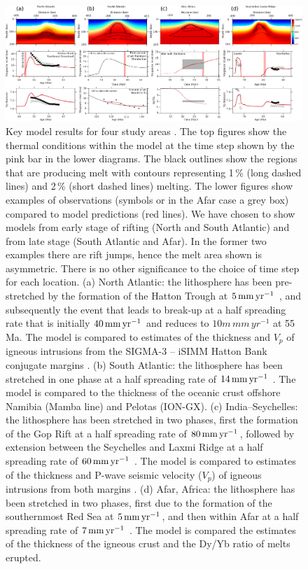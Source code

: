 \begin{figure}
\centering
\includegraphics[width=22.5cm]{./figures/ch2-mantle2.pdf}
\caption{Key model results for four study areas \citep[see][]{armitage-collier-2017}. The top figures show the thermal conditions within the model at the time step shown by the pink bar in the lower diagrams. The black outlines show the regions that are producing melt with contours representing 1\,\% (long dashed lines) and 2\,\% (short dashed lines) melting. The lower figures show examples of observations (symbols or in the Afar case a grey box) compared to model predictions (red lines). We have chosen to show models from early stage of rifting (North and South Atlantic) and from late stage (South Atlantic and Afar). In the former two examples there are rift jumps, hence the melt area shown is asymmetric. There is no other significance to the choice of time step for each location. (a) North Atlantic: the lithosphere has been pre-stretched by the formation of the Hatton Trough at $5\rm\,mm\,yr^{-1}$ \citep[see][]{armitage-etal-2009}, and subsequently the event that leads to break-up at a half spreading rate that is initially $40\rm\,mm\,yr^{-1}$ and reduces to $10
m\,mm\,yr^{-1}$ at 55\,Ma. The model is compared to estimates of the thickness and $V_{p}$ of igneous intrusions from the SIGMA-3 -- iSIMM Hatton Bank conjugate margins \citep{hopper-etal-2003,white-etal-2008}. (b) South Atlantic: the lithosphere has been stretched in one phase at a half spreading rate of $14\rm\,mm\,yr^{-1}$ \citep[see][]{taposeea-etal-2016}. The model is compared to the thickness of the oceanic crust offshore Namibia (Mamba line) and Pelotas (ION-GX). (c) India–Seychelles: the lithosphere has been stretched in two phases, first the formation of the Gop Rift at a half spreading rate of $80\rm\,mm\,yr^{-1}$, followed by extension between the Seychelles and Laxmi Ridge at a half spreading rate of $60\rm\,mm\,yr^{-1}$ \citep[see][]{armitage-etal-g3-2011}. The model is compared to estimates of the thickness and P-wave seismic velocity ($V_{p}$) of igneous intrusions from both margins \citep{collier-etal-2009,minshull-etal-2008}. (d) Afar, Africa: the lithosphere has been stretched in two phases, first due to the formation of the southernmost Red Sea at $5\rm\,mm\,yr^{-1}$, and then within Afar at a half spreading rate of $7\rm\,mm\,yr^{-1}$ \citep[see][]{armitage-etal-2015}. The model is compared the estimates of the thickness of the igneous crust and the Dy/Yb ratio of melts erupted.}
\label{fg:4models}
\end{figure}

